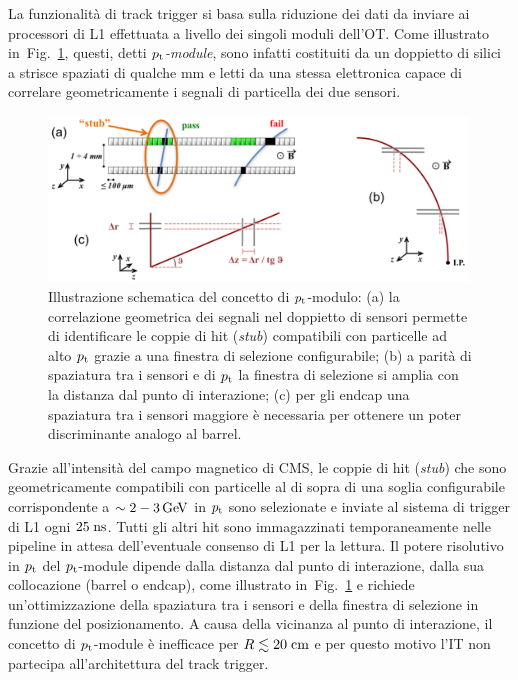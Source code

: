 La funzionalit\`a di track trigger si basa sulla riduzione dei dati da inviare ai processori di L1 effettuata a livello dei singoli moduli dell'OT. Come illustrato in~Fig.~\ref{fig:PtModuleConcept}, questi, detti {\em ${p_{\rm t}}$-module}, sono infatti costituiti da un doppietto di silici a strisce spaziati di qualche mm e letti da una stessa elettronica capace di correlare geometricamente i segnali di particella dei due sensori.
\begin{figure}
\centering
\includegraphics[width=0.99\textwidth]{Immagini/pt_module_concept.PNG}
\caption{Illustrazione schematica del concetto di ${p_{\rm t}}$-modulo: (a) la correlazione geometrica dei segnali nel doppietto di sensori permette di identificare le coppie di hit ({\em stub}) compatibili con particelle ad alto ${p_{\rm t}}$ grazie a una finestra di selezione configurabile; (b) a parit\`a di spaziatura tra i sensori e di ${p_{\rm t}}$ la finestra di selezione si amplia con la distanza dal punto di interazione; (c) per gli endcap una spaziatura tra i sensori maggiore \`e necessaria per ottenere un poter discriminante analogo al barrel.}
\label{fig:PtModuleConcept}
\end{figure}
Grazie all'intensit\`a del campo magnetico di CMS, le coppie di hit ({\em stub}) che sono geometricamente compatibili con particelle al di sopra di una soglia configurabile corrispondente a $\sim 2-3{\rm \, Ge\kern-0.125em V}$ in ${p_{\rm t}}$ sono selezionate e inviate al sistema di trigger di L1 ogni $25\rm \; ns$. Tutti gli altri hit sono immagazzinati temporaneamente nelle pipeline in attesa dell'eventuale consenso di L1 per la lettura. Il potere risolutivo in ${p_{\rm t}}$ del ${p_{\rm t}}$-module dipende dalla distanza dal punto di interazione, dalla sua collocazione (barrel o endcap), come illustrato in~Fig.~\ref{fig:PtModuleConcept} e richiede un'ottimizzazione della spaziatura tra i sensori e della finestra di selezione in funzione del posizionamento. A causa della vicinanza al punto di interazione, il concetto di ${p_{\rm t}}$-module \`e inefficace per $R\lesssim20\rm \; cm$ e per questo motivo l'IT non partecipa all'architettura del track trigger.

